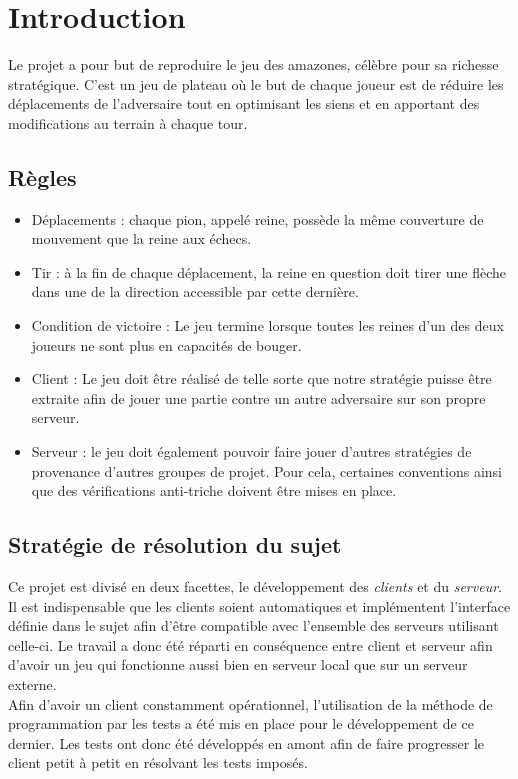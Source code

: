 \chapter{Introduction}

Le projet a pour but de reproduire le jeu des amazones, célèbre pour sa richesse stratégique. C’est un jeu de plateau où le but de chaque joueur est de réduire les déplacements de l'adversaire tout en optimisant les siens et en apportant des modifications au terrain à chaque tour. 

\section{Règles}

\begin{itemize}
    \item[\textdagger] Déplacements : chaque pion, appelé reine, possède la même couverture de mouvement que la reine aux échecs.
    \medbreak
    \item [\textdagger] Tir : à la fin de chaque déplacement, la reine en question doit tirer une flèche dans une de la direction accessible par cette dernière.
    \medbreak
    \item [\textdagger] Condition de victoire : Le jeu termine lorsque toutes les reines d’un des deux joueurs ne sont plus en capacités de bouger.
    \medbreak
    \item [\textdagger] Client : Le jeu doit être réalisé de telle sorte que notre stratégie puisse être extraite afin de jouer une partie contre un autre adversaire sur son propre serveur.
    \medbreak
    \item [\textdagger] Serveur : le jeu doit également pouvoir faire jouer d'autres stratégies de provenance d'autres groupes de projet. Pour cela, certaines conventions ainsi que des vérifications anti-triche doivent être mises en place.
\end{itemize}

\section{Stratégie de résolution du sujet}

Ce projet est divisé en deux facettes, le développement des \textit{clients} et du \textit{serveur}. Il est indispensable que les clients soient automatiques et implémentent l'interface définie dans le sujet afin d'être compatible avec l'ensemble des serveurs utilisant celle-ci. Le travail a donc été réparti en conséquence entre client et serveur afin d'avoir un jeu qui fonctionne aussi bien en serveur local que sur un serveur externe.\\
Afin d'avoir un client constamment opérationnel, l'utilisation de la méthode de programmation par les tests a été mis en place pour le développement de ce dernier. Les tests ont donc été développés en amont afin de faire progresser le client petit à petit en résolvant les tests imposés.

